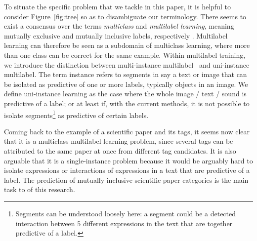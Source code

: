 To situate the specific problem that we tackle in this paper, it is helpful to consider Figure~\ref{fig:tree} so as to disambiguate our terminology. There seems to exist a consensus over the terms \emph{multiclass} and \emph{multilabel learning}, meaning mutually exclusive and mutually inclusive labels, respectively . 
Multilabel learning can therefore be seen as a subdomain of multiclass learning, where more than one class can be correct for the same example. 
Within multilabel training, we introduce the distinction between multi-instance multilabel~\citep[e.g.,][]{multiInstance, multiInstanceMultiLabel} and uni-instance multilabel. The term instance refers to segments in say a text or image that can be isolated as predictive of one or more labels, typically objects in an image. We define uni-instance learning as the case where the whole image / text / sound is predictive of a label; or at least if, with the current methods, it is not possible to isolate segments\footnote{Segments can be understood loosely here: a segment could be a detected interaction between 5 different expressions in the text that are together predictive of a label.} as predictive of certain labels.

Coming back to the example of a scientific paper and its tags, it seems now clear that it is a multiclass multilabel learning problem, since several tags can be attributed to the same paper at once from different tag candidates. It is also arguable that it is a single-instance problem because it would be arguably hard to isolate expressions or interactions of expressions in a text that are predictive of a label. The prediction of mutually inclusive scientific paper categories is the main task to of this research.

